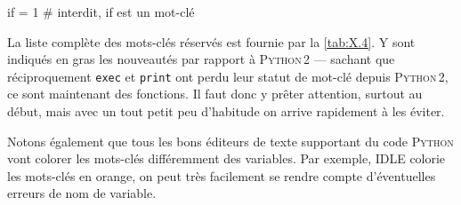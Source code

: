 \begin{nbjupyterin}[before skip=4pt, after skip=0pt]{}
if = 1  # interdit, if est un mot-clé
\end{nbjupyterin}

\vspace{4pt}

La liste complète des mots-clés réservés est fournie par la \cref{tab:X.4}. Y sont indiqués en gras les nouveautés par rapport à \textsc{Python\,2} --- sachant que réciproquement \texttt{exec} et \texttt{print} ont perdu leur statut de mot-clé depuis \textsc{Python\,2}, ce sont maintenant des fonctions.
Il faut donc y prêter attention, surtout au début, mais avec un tout petit peu d'habitude on arrive rapidement à les éviter. 


Notons également que tous les bons éditeurs de texte supportant du code \textsc{Python} vont colorer les mots-clés différemment des variables. Par exemple, IDLE colorie les mots-clés en orange, on peut très facilement se rendre compte d'éventuelles erreurs de nom de variable.

